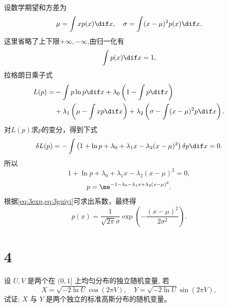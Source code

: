 \documentclass[12pt,a4]{ctexart}
\begin{document}
设数学期望和方差为
\begin{equation}
	\mu = \int x p(x) \dif x, \quad \sigma = \int (x-\mu)^2 p(x) \dif x.
	\label{eq:3exp}
\end{equation}
这里省略了上下限$+\infty,-\infty$,由归一化有
\begin{equation}
	\int p(x) \dif x = 1,
	\label{eq:3guiyi}
\end{equation}
拉格朗日乘子式
\begin{equation}
	\begin{aligned}
		L(p) = & - \int p \ln p \dif x + \lambda_0 \left(1- \int p \dif x\right)                                            \\
		       & + \lambda_1 \left( \mu - \int x p \dif x\right) + \lambda_2 \left(\sigma - \int (x-\mu)^2 p \dif x\right).
	\end{aligned}
\end{equation}
对$L(p)$求$p$的变分，得到下式
\begin{equation}
	\delta L(p)  = - \int \left( 1 + \ln p + \lambda_0 + \lambda_1 x - \lambda_2 (x-\mu)^2 \right) \delta p \dif x = 0.
\end{equation}
所以
\begin{equation}
	1 + \ln p + \lambda_0 + \lambda_1 x - \lambda_2 (x-\mu)^2 = 0,
\end{equation}
\begin{equation}
	p = \me^{-1-\lambda_0 - \lambda_1 x + \lambda_2 (x-\mu)^2}.
\end{equation}
根据\cref{eq:3exp,eq:3guiyi}可求出系数，最终得
\begin{equation}
	p(x)=\frac{1}{\sqrt{2 \pi} \sigma} \exp \left(-\frac{(x-\mu)^{2}}{2 \sigma^{2}}\right).
\end{equation}


\section{4}

设 $U, V$ 是两个在 $(0,1]$ 上均匀分布的独立随机变量, 若
\begin{equation}
	X=\sqrt{-2 \ln U} \cos (2 \pi V),\quad Y=\sqrt{-2 \ln U} \sin (2 \pi V),
\end{equation}
试证: $X$ 与 $Y$ 是两个独立的标准高斯分布的随机变量。
\end{document}
